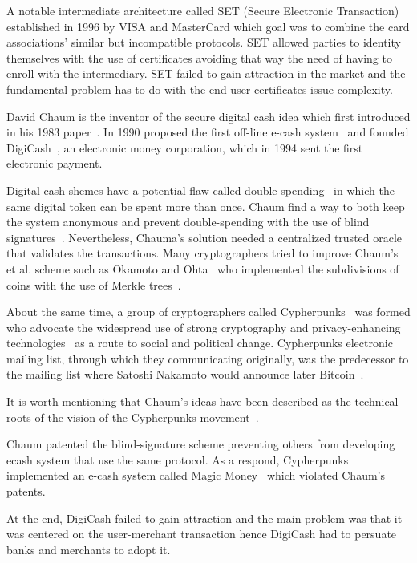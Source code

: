 A notable intermediate architecture called SET (Secure Electronic Transaction)~\cite{set} established in 1996 by VISA and MasterCard which goal was to combine the card associations' similar but incompatible protocols. SET allowed parties to identity themselves with the use of
certificates avoiding that way the need of having to enroll with the intermediary. SET failed to gain attraction in the market and the fundamental
problem has to do with the end-user certificates issue complexity.

David Chaum is the inventor of the secure digital cash idea which first introduced in his 1983 paper~\cite{Chaum1983}. In 1990 proposed the first off-line e-cash system~\cite{Chaum:1988:UEC:646753.704915} and founded DigiCash~\cite{chaum1983blind}, an electronic money corporation,
which in 1994 sent the first electronic payment.

Digital cash shemes have a potential flaw called double-spending~\cite{10.1007/978-3-662-46803-6_10, 7163021} in which the same digital token can be spent more than once.
Chaum find a way to both keep the system anonymous and prevent double-spending with the use of blind signatures~\cite{Chaum1983,Chaum:1988:UEC:646753.704915}.
Nevertheless, Chauma's solution needed a centralized trusted oracle that validates the transactions. Many cryptographers tried to improve Chaum's et al. scheme such as Okamoto and Ohta~\cite{Watanabe1996} who implemented the subdivisions of coins with the use of Merkle trees~\cite{merkle_tree}.

About the same time, a group of cryptographers called Cypherpunks~\cite{cypherpunk,cypherpunks_manifesto} was formed who advocate the widespread
use of strong cryptography and privacy-enhancing technologies~\cite{cypherpunks_manifesto} as a route to social and political change. Cypherpunks electronic mailing list,
through which they communicating originally, was the predecessor to the mailing list where Satoshi Nakamoto would announce later Bitcoin~\cite{nakamoto2012bitcoin}.

It is worth mentioning that Chaum's ideas have been described as the technical roots of the vision of the Cypherpunks movement~\cite{cypherpunk}.

Chaum patented the blind-signature scheme preventing others from developing ecash system that use the same protocol. As a respond,
Cypherpunks implemented an e-cash system called Magic Money~\cite{magic_money} which violated Chaum's patents.

At the end, DigiCash failed to gain attraction and the main problem was that it was centered on the user-merchant transaction hence
DigiCash had to persuate banks and merchants to adopt it.

